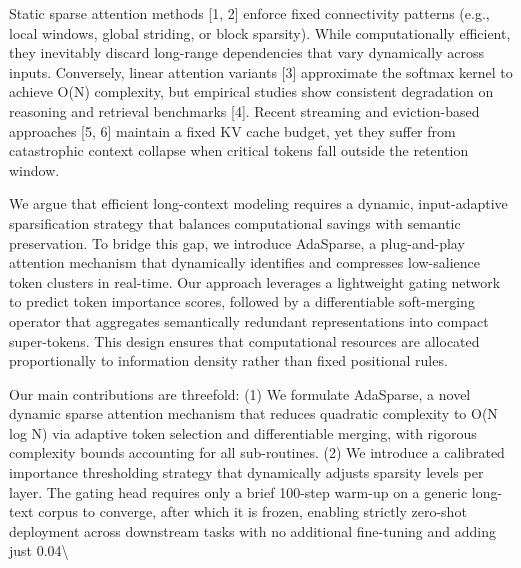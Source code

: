 \documentclass[11pt,a4paper]{article}
\begin{document}
Static sparse attention methods [1, 2] enforce fixed connectivity patterns (e.g., local windows, global striding, or block sparsity). While computationally efficient, they inevitably discard long-range dependencies that vary dynamically across inputs. Conversely, linear attention variants [3] approximate the softmax kernel to achieve O(N) complexity, but empirical studies show consistent degradation on reasoning and retrieval benchmarks [4]. Recent streaming and eviction-based approaches [5, 6] maintain a fixed KV cache budget, yet they suffer from catastrophic context collapse when critical tokens fall outside the retention window.

We argue that efficient long-context modeling requires a dynamic, input-adaptive sparsification strategy that balances computational savings with semantic preservation. To bridge this gap, we introduce AdaSparse, a plug-and-play attention mechanism that dynamically identifies and compresses low-salience token clusters in real-time. Our approach leverages a lightweight gating network to predict token importance scores, followed by a differentiable soft-merging operator that aggregates semantically redundant representations into compact super-tokens. This design ensures that computational resources are allocated proportionally to information density rather than fixed positional rules.

Our main contributions are threefold: (1) We formulate AdaSparse, a novel dynamic sparse attention mechanism that reduces quadratic complexity to O(N log N) via adaptive token selection and differentiable merging, with rigorous complexity bounds accounting for all sub-routines. (2) We introduce a calibrated importance thresholding strategy that dynamically adjusts sparsity levels per layer. The gating head requires only a brief 100-step warm-up on a generic long-text corpus to converge, after which it is frozen, enabling strictly zero-shot deployment across downstream tasks with no additional fine-tuning and adding just 0.04\textbackslash{}%
\end{document}
